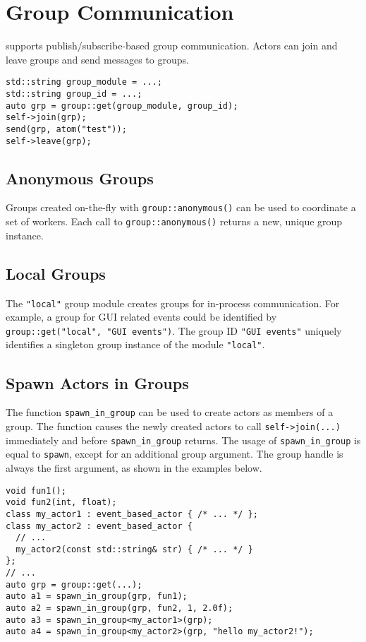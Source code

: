 \section{Group Communication}
\label{Sec::Group}

\libcppa supports publish/subscribe-based group communication.
Actors can join and leave groups and send messages to groups.

\begin{lstlisting}
std::string group_module = ...;
std::string group_id = ...;
auto grp = group::get(group_module, group_id);
self->join(grp);
send(grp, atom("test"));
self->leave(grp);
\end{lstlisting}

\subsection{Anonymous Groups}
\label{Sec::Group::Anonymous}

Groups created on-the-fly with \lstinline^group::anonymous()^ can be used to coordinate a set of workers.
Each call to \lstinline^group::anonymous()^ returns a new, unique group instance.

\subsection{Local Groups}
\label{Sec::Group::Local}

The \lstinline^"local"^ group module creates groups for in-process communication.
For example, a group for GUI related events could be identified by \lstinline^group::get("local", "GUI events")^.
The group ID \lstinline^"GUI events"^ uniquely identifies a singleton group instance of the module \lstinline^"local"^.

\subsection{Spawn Actors in Groups}
\label{Sec::Group::Spawn}

The function \lstinline^spawn_in_group^ can be used to create actors as members of a group.
The function causes the newly created actors to call \lstinline^self->join(...)^ immediately and before \lstinline^spawn_in_group^ returns. 
The usage of \lstinline^spawn_in_group^ is equal to \lstinline^spawn^, except for an additional group argument.
The group handle is always the first argument, as shown in the examples below.

\begin{lstlisting}
void fun1();
void fun2(int, float);
class my_actor1 : event_based_actor { /* ... */ };
class my_actor2 : event_based_actor {
  // ...
  my_actor2(const std::string& str) { /* ... */ }
};
// ...
auto grp = group::get(...);
auto a1 = spawn_in_group(grp, fun1);
auto a2 = spawn_in_group(grp, fun2, 1, 2.0f);
auto a3 = spawn_in_group<my_actor1>(grp);
auto a4 = spawn_in_group<my_actor2>(grp, "hello my_actor2!");
\end{lstlisting}
